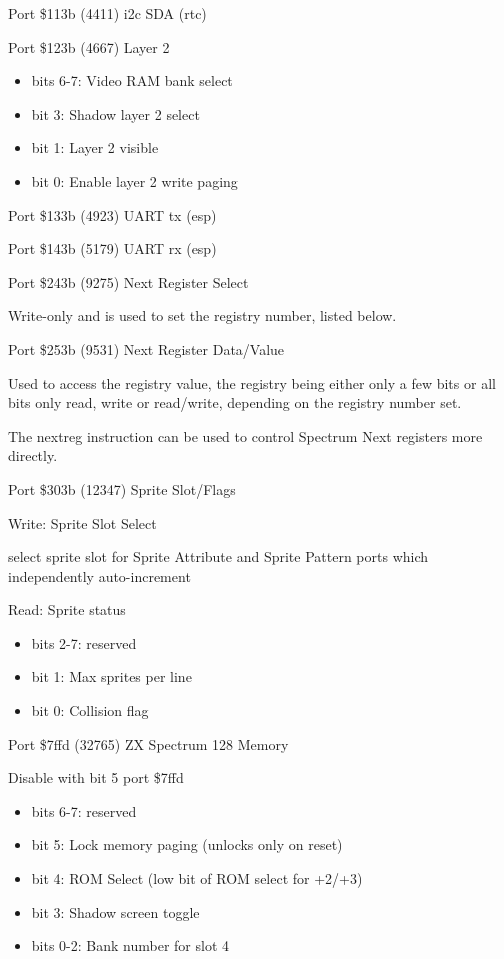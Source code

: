 Port \$113b (4411) i2c SDA (rtc)

Port \$123b (4667) Layer 2
\begin{itemize}
  \item[] bits 6-7: Video RAM bank select
  \item[] bit 3: Shadow layer 2 select
  \item[] bit 1: Layer 2 visible
  \item[] bit 0: Enable layer 2 write paging
\end{itemize}

Port \$133b (4923) UART tx (esp)

Port \$143b (5179) UART rx (esp)

Port \$243b (9275) Next Register Select

Write-only and is used to set the registry number, listed below.

Port \$253b (9531) Next Register Data/Value

Used to access the registry value, the registry being either only a
few bits or all bits only read, write or read/write, depending on the
registry number set.

The nextreg instruction can be used to control Spectrum Next registers
more directly.

Port \$303b (12347) Sprite Slot/Flags

Write: Sprite Slot Select

select sprite slot for Sprite Attribute and Sprite Pattern ports which
independently auto-increment

Read: Sprite status
\begin{itemize}
\item[] bits 2-7: reserved
\item[] bit 1: Max sprites per line
\item[] bit 0: Collision flag
\end{itemize}

Port \$7ffd (32765) ZX Spectrum 128 Memory

Disable with bit 5 port \$7ffd
\begin{itemize}
\item[] bits 6-7: reserved
\item[] bit 5: Lock memory paging (unlocks only on reset)
\item[] bit 4: ROM Select (low bit of ROM select for +2/+3)
\item[] bit 3: Shadow screen toggle
\item[] bits 0-2: Bank number for slot 4
\end{itemize}

